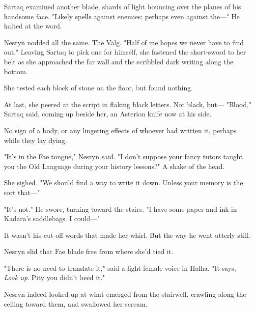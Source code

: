 Sartaq examined another blade, shards of light bouncing over the planes of his handsome face. "Likely spells against enemies; perhaps even against the---" He halted at the word.

Nesryn nodded all the same. The Valg. "Half of me hopes we never have to find out." Leaving Sartaq to pick one for himself, she fastened the short-sword to her belt as she approached the far wall and the scribbled dark writing along the bottom.

She tested each block of stone on the floor, but found nothing.

At last, she peered at the script in flaking black letters. Not black, but--- "Blood," Sartaq said, coming up beside her, an Asterion knife now at his side.

No sign of a body, or any lingering effects of whoever had written it, perhaps while they lay dying.

"It's in the Fae tongue," Nesryn said. "I don't suppose your fancy tutors taught you the Old Language during your history lessons?" A shake of the head.

She sighed. "We should find a way to write it down. Unless your memory is the sort that---"

"It's not." He swore, turning toward the stairs. "I have some paper and ink in Kadara's saddlebags. I could---"

It wasn't his cut-off words that made her whirl. But the way he went utterly still.

Nesryn slid that Fae blade free from where she'd tied it.

"There is no need to translate it," said a light female voice in Halha. "It says, \emph{Look up}. Pity you didn't heed it."

Nesryn indeed looked up at what emerged from the stairwell, crawling along the ceiling toward them, and swallowed her scream.

